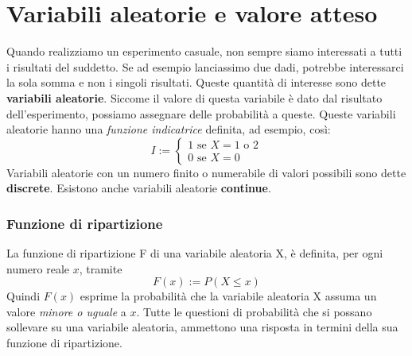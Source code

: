 \documentclass[11pt]{article}
\begin{document}
\section{Variabili aleatorie e valore atteso}
Quando realizziamo un esperimento casuale, non sempre siamo interessati a tutti i risultati del suddetto. Se ad esempio lanciassimo due dadi, potrebbe interessarci la sola somma e non i singoli risultati. 
Queste quantità di interesse sono dette \textbf{variabili aleatorie}. Siccome il valore di questa variabile è dato dal risultato dell'esperimento, possiamo assegnare delle probabilità a queste. Queste variabili aleatorie hanno una \textit{funzione indicatrice} definita, ad esempio, così:
\begin{displaymath}
    I:=
    \begin{cases}
        1 \mbox{ se } X = 1 \mbox{ o } 2\\
        0 \mbox{ se } X = 0
    \end{cases}
\end{displaymath}
Variabili aleatorie con un numero finito o numerabile di valori possibili sono dette \textbf{discrete}. Esistono anche variabili aleatorie \textbf{continue}.
\subsubsection{Funzione di ripartizione}
La funzione di ripartizione F di una variabile aleatoria X, è definita, per ogni numero reale $x$, tramite
\begin{displaymath}
    F(x) := P(X\le x)
\end{displaymath}
Quindi $F(x)$ esprime la probabilità che la variabile aleatoria X assuma un valore \textit{minore o uguale} a $x$. Tutte le questioni di probabilità che si possano sollevare su una variabile aleatoria, ammettono una risposta in termini della sua funzione di ripartizione.
\end{document}
